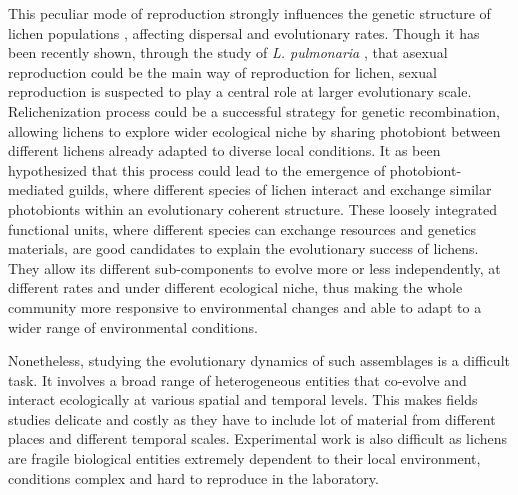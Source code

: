 \documentclass[runningheads,a4paper]{llncs}
\begin{document}
This peculiar mode of reproduction strongly influences the genetic structure of lichen populations \cite{dal2012vertical,dal2011phylogeny}, affecting dispersal and evolutionary rates. 
Though it has been recently shown, through the study of {\em L. pulmonaria} \cite{dal2012vertical}, that asexual reproduction could be the main way of reproduction for lichen, sexual reproduction is suspected to play a central role at larger evolutionary scale. Relichenization process could be a successful strategy for genetic recombination, allowing lichens to  explore wider ecological niche by sharing photobiont between different lichens already adapted to diverse local conditions. It as been hypothesized \cite{rikkinen2003ecological} that this process could lead to the emergence of photobiont-mediated guilds, where different species of lichen interact and exchange similar photobionts within an evolutionary coherent structure. These loosely integrated functional units, where different species can exchange resources and genetics materials, are good candidates to explain the evolutionary success of lichens. They allow its different sub-components to evolve more or less independently, at different rates and under different ecological niche, thus making the whole community more responsive to environmental changes and able to adapt to a wider range of environmental conditions.

Nonetheless, studying the evolutionary dynamics of such assemblages is a difficult task. It involves a broad range of heterogeneous entities that co-evolve and interact ecologically at various spatial and temporal levels. This makes fields studies delicate and costly as they have to include lot of material from different places and different temporal scales. Experimental work is also difficult as lichens are fragile biological entities extremely dependent to their local environment, conditions complex and hard to reproduce in the laboratory.    
\end{document}
